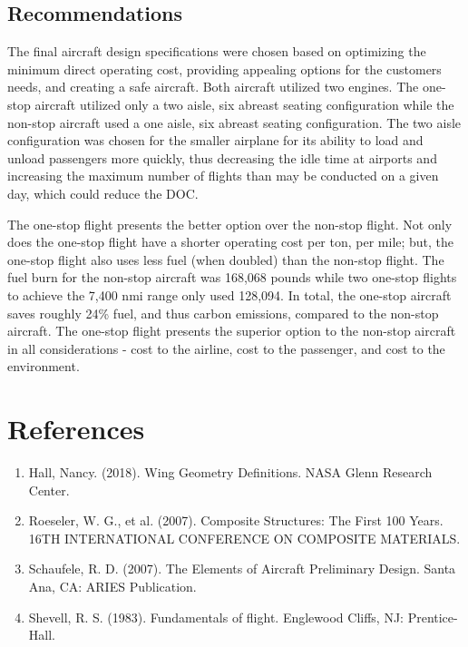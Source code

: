 \documentclass{article}
\begin{document}
    \subsection{Recommendations}
    \label{sec:Recommendations}
        \begin{flushleft}
            The final aircraft design specifications were chosen based on
            optimizing the minimum direct operating cost, providing appealing
            options for the customers needs, and creating a safe aircraft. Both
            aircraft utilized two engines. The one-stop aircraft utilized only a
            two aisle, six abreast seating configuration while the non-stop
            aircraft used a one aisle, six abreast seating configuration. The
            two aisle configuration was chosen for the smaller airplane for its
            ability to load and unload passengers more quickly, thus decreasing
            the idle time at airports and increasing the maximum number of
            flights than may be conducted on a given day, which could reduce the DOC.


            The one-stop flight presents the better option over the non-stop
            flight. Not only does the one-stop flight have a shorter operating
            cost per ton, per mile; but, the one-stop flight also uses less fuel
            (when doubled) than the non-stop flight. The fuel burn for the
            non-stop aircraft was 168,068 pounds while two one-stop flights to
            achieve the 7,400 nmi range only used 128,094. In total, the
            one-stop aircraft saves roughly 24\% fuel, and thus carbon
            emissions, compared to the non-stop aircraft. The one-stop flight
            presents the superior option to the non-stop aircraft in all
            considerations - cost to the airline, cost to the passenger, and
            cost to the environment.
        \end{flushleft}

    \section{References}
        \begin{flushleft}
            \begin{enumerate}
                \item Hall, Nancy. (2018). Wing Geometry Definitions. NASA Glenn Research Center.
                \item Roeseler, W. G., et al. (2007). Composite Structures: The First 100 Years. 16TH INTERNATIONAL CONFERENCE ON COMPOSITE MATERIALS.
                \item Schaufele, R. D. (2007). The Elements of Aircraft Preliminary Design. Santa Ana, CA: ARIES Publication.
                \item Shevell, R. S. (1983). Fundamentals of flight. Englewood Cliffs, NJ: Prentice-Hall.
            \end{enumerate}
        \end{flushleft}
\end{document}
